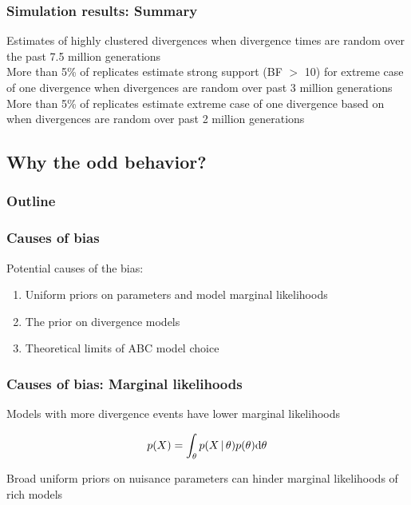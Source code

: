 \begin{frame}
    \frametitle{Simulation results: Summary}
    Estimates of highly clustered divergences when divergence times are random
    over the past 7.5 million generations \\
    \bigskip
    More than 5\% of replicates estimate strong support (BF $>$ 10) for
    extreme case of one divergence when divergences are random over past 3
    million generations \\
    \bigskip
    More than 5\% of replicates estimate extreme case of one divergence based
    on \vmratio{} when divergences are random over past 2 million generations
\end{frame}

\subsection{Why the odd behavior?}

\begin{frame}
\frametitle{Outline}
\end{frame}

\begin{frame}
    \frametitle{Causes of bias}
    Potential causes of the bias:
    \begin{enumerate}
        \item Uniform priors on parameters and model marginal likelihoods
        \item The prior on divergence models
        \item Theoretical limits of ABC model choice
    \end{enumerate}
\end{frame}

\begin{frame}
    \frametitle{Causes of bias: Marginal likelihoods}
    Models with more divergence events have lower marginal likelihoods \\
    \bigskip
    \begin{displaybox}[5.5cm]
        \small
        \[
            p(X) = \int_{\theta} p(X
            \,|\, \theta) p(\theta) \mathrm{d}\theta
        \]%
    \end{displaybox}
    \bigskip
    Broad uniform priors on nuisance parameters can hinder marginal likelihoods
    of rich models \\
\end{frame}


